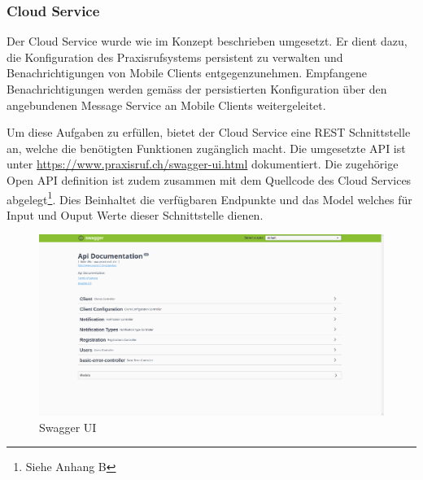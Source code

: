 \subsubsection{Cloud Service}

Der Cloud Service wurde wie im Konzept beschrieben umgesetzt.
Er dient dazu, die Konfiguration des Praxisrufsystems persistent zu verwalten und Benachrichtigungen von Mobile Clients entgegenzunehmen.
Empfangene Benachrichtigungen werden gemäss der persistierten Konfiguration über den angebundenen Message Service an Mobile Clients weitergeleitet.

Um diese Aufgaben zu erfüllen, bietet der Cloud Service eine REST Schnittstelle an, welche die benötigten Funktionen zugänglich macht.
Die umgesetzte API ist unter \url{https://www.praxisruf.ch/swagger-ui.html} dokumentiert.
Die zugehörige Open API definition ist zudem zusammen mit dem Quellcode des Cloud Services abgelegt\footnote{Siehe Anhang B}.
Dies Beinhaltet die verfügbaren Endpunkte und das Model welches für Input und Ouput Werte dieser Schnittstelle dienen.

\begin{figure}[h]
    \begin{minipage}[b]{1\textwidth}
        \includegraphics[width=\textwidth]{graphics/screenshots/cloud/swagger-home}
        \caption{Swagger UI}
    \end{minipage}
    \label{fig:swagger}
\end{figure}
\clearpage
